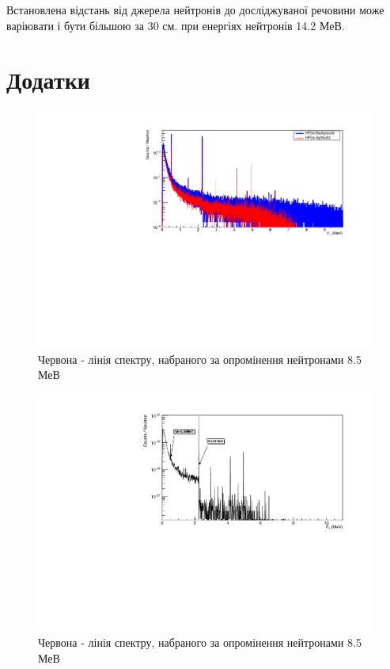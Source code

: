 \documentclass[a4paper, 14pt]{article}
\numberwithin{equation}{section}
\numberwithin{table}{section}
\begin{document}
Встановлена відстань від джерела нейтронів до досліджуваної речовини може варіювати і бути більшою за 30 см. при енергіях нейтронів 14.2 МеВ.
	
	
\newpage 
\section{Додатки}
\setcounter{figure}{0}
\begin{figure}[h!]
	\centering \includegraphics[width=1\textwidth]{res/Ag3AuS2_8_5MeVFonClasic.pdf}
	\caption{Червона - лінія спектру, набраного за опромінення нейтронами 8.5 МеВ}
	\label{ris:Ag3AuS28_5MeV}	
\end{figure} 
\begin{figure}[h!]
	\centering \includegraphics[width=1\textwidth]{res/AuAgS28MeV.pdf}
	\caption{Червона - лінія спектру, набраного за опромінення нейтронами 8.5 МеВ}
	\label{ris:Ag3AuS22_8MeV}	
\end{figure}
\end{document}
